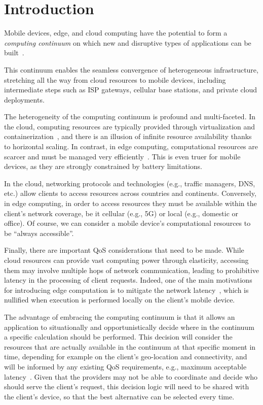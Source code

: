 \section{Introduction}
\label{sec:intro}

Mobile devices, edge, and cloud computing have the potential to form a \textit{computing continuum} on which new and disruptive types of applications can be built~\cite{ChiangFogIoT16}. %

This continuum enables the seamless convergence of heterogeneous infrastructure, stretching all the way from cloud resources to mobile devices, including intermediate steps such as ISP gateways, cellular base stations, and private cloud deployments.  

The heterogeneity of the computing continuum is profound and multi-faceted. In the cloud, computing resources are typically provided through virtualization and containerization~\cite{leitner2016patterns, Quatrocchi2016discrete}, and there is an illusion of infinite resource availability thanks to horizontal scaling. In contrast, in edge computing, computational resources are scarcer and must be managed very efficiently~\cite{Dehos14millimeter5g,GarrigaMendonca2017}. This is even truer for mobile devices, as they are strongly constrained by battery limitations. 

In the cloud, networking protocols and technologies (e.g., traffic managers, DNS, etc.) allow clients to access resources across countries and continents. Conversely, in edge computing, in order to access resources they must be available within the client's network coverage, be it cellular (e.g., 5G) or local (e.g., domestic or office). Of course, we can consider a mobile device's computational resources  to be ``always accessible''.

Finally, there are important QoS considerations that need to be made. While cloud resources can provide vast computing power through elasticity, accessing them may involve multiple hops of network communication, leading to prohibitive latency in the processing of client requests. Indeed, one of the main motivations for introducing edge computation is to mitigate the network latency~\cite{Shi:2016}, which is nullified when execution is performed locally on the client's mobile device.

The advantage of embracing the computing continuum is that it allows an application to situationally and opportunistically decide where in the continuum a specific calculation should be performed. This decision will consider the resources that are actually available in the continuum at that specific moment in time, depending for example on the client's geo-location and connectivity, and will be informed by any existing QoS requirements, e.g., maximum acceptable latency~\cite{GuptaIfogSim17}. Given that the providers may not be able to coordinate and decide who should serve the client's request, this decision logic will need to be shared with the client's device, so that the best alternative can be selected every time.

